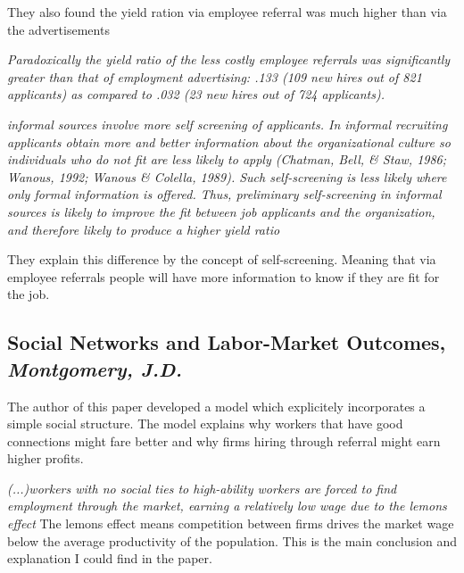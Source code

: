 \documentclass[a4paper, 11pt]{article} %
\begin{document}
They also found the yield ration via employee referral was much higher than via the advertisements

\emph{Paradoxically the yield ratio of the less costly employee referrals was
signiﬁcantly greater than that of employment advertising: .133 (109 new
hires out of 821 applicants) as compared to .032 (23 new hires out of 724
applicants).}

\emph{informal sources involve more self screening of applicants. In
informal recruiting applicants obtain more and better information about the
organizational culture so individuals who do not ﬁt are less likely to apply
(Chatman, Bell, & Staw, 1986; Wanous, 1992; Wanous & Colella, 1989).
Such self-screening is less likely where only formal information is oﬀered.
Thus, preliminary self-screening in informal sources is likely to improve the
ﬁt between job applicants and the organization, and therefore likely to
produce a higher yield ratio}

They explain this difference by the concept of self-screening. Meaning that via employee referrals people will have more information to know if they are fit for the job. 

\subsection*{Social Networks and Labor-Market Outcomes, \emph{Montgomery, J.D.} \cite{twelveth}}
The author of this paper developed a model which explicitely incorporates a simple social structure.
The model explains why workers that have good connections might fare better and why firms hiring through referral might earn higher profits.

\emph{(...)workers with no social ties to high-ability workers are forced to find employment through the market, earning a relatively low wage due to the lemons effect}
The lemons effect means competition between firms drives the market wage below the average productivity of the population.
This is the main conclusion and explanation I could find in the paper.







\end{document}
